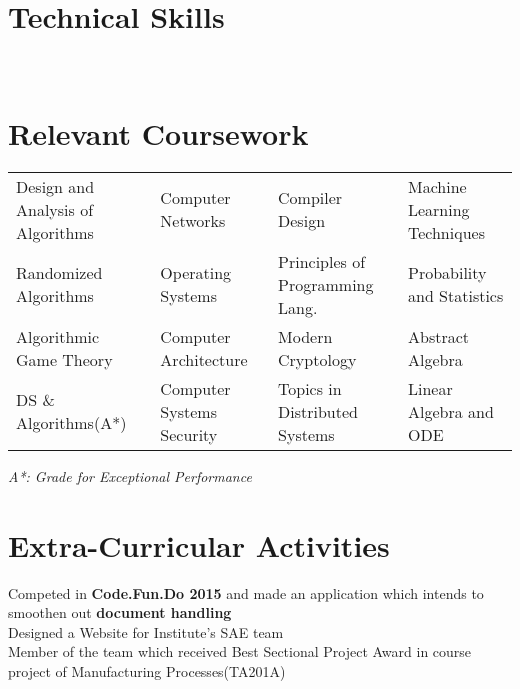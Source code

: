 \documentclass[a4paper]{norm-resume}
\begin{document}
\vspace{2mm}    %


\section{Technical Skills \hrulefill}

 \hfill {} \\
 \hfill {}

\vspace{2mm}    %


\section{Relevant Coursework \hrulefill}

\begin{table}[h!]
    \small
    \vspace{-\topsep}
    \begin{tabular}{l l l l}
        Design and Analysis of Algorithms
        & Computer Networks
        & Compiler Design
        & Machine Learning Techniques \\
        Randomized Algorithms
        & Operating Systems
        & Principles of Programming Lang.
        & Probability and Statistics \\
        Algorithmic Game Theory
        & Computer Architecture
        & Modern Cryptology
        & Abstract Algebra \\
        DS \& Algorithms(A*)
        & Computer Systems Security
        & Topics in Distributed Systems
        & Linear Algebra and ODE \\
    \end{tabular}
    \vspace{-\topsep}
\end{table}
\hfill \small
\textit{A*: Grade for Exceptional Performance}

\normalsize

\vspace{-2mm}    %


\section{Extra-Curricular Activities \hrulefill}
Competed in \textbf{Code.Fun.Do 2015} and made an application which intends to smoothen out \textbf{document handling} \\
Designed a Website for Institute’s SAE team \\
Member of the team which received Best Sectional Project Award in course project of Manufacturing Processes(TA201A)
\end{document}
